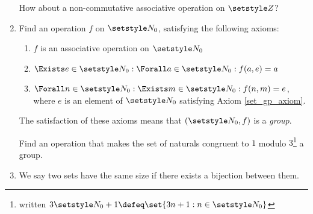 \begin{enumerate}
  How about a non-commutative associative operation on \(\Integers\)?
 \item
  Find an operation \(f\) on \(\Naturals_0\), satisfying the following axioms:
  \begin{enumerate}
   \item
    \(f\) is an associative operation on \(\Naturals_0\)
   \item \label{set_gp_axiom}
    \(\Exists e \in \Naturals_0 : \Forall a \in \Naturals_0 : f(a, e) = a\)
   \item
    \(\Forall n \in \Naturals_0 : \Exists m \in \Naturals_0 : f(n, m) = e\),
    where \(e\) is an element of \(\Naturals_0\) satisfying Axiom
    \ref{set_gp_axiom}.
  \end{enumerate}
  The satisfaction of these axioms means that \((\Naturals_0, f)\) is a
  \emph{group}.

  Find an operation that makes the set of naturals congruent to
  \(1\) modulo \(3\)\footnote{
   written \(3\Naturals_0 + 1 \defeq \set{3n + 1 : n \in \Naturals_0}\)
  } a group.
 \item
  We say two sets have the same size if there exists a bijection between them.


\end{enumerate}
